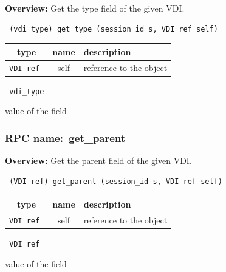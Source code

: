 {\bf Overview:} 
Get the type field of the given VDI.

\begin{verbatim} (vdi_type) get_type (session_id s, VDI ref self)\end{verbatim}



 
\vspace{0.3cm}
\begin{tabular}{|c|c|p{7cm}|}
 \hline
{\bf type} & {\bf name} & {\bf description} \\ \hline
{\tt VDI ref } & self & reference to the object \\ \hline 

\end{tabular}

\vspace{0.3cm}

{\tt 
vdi\_type
}


value of the field
\vspace{0.3cm}
\vspace{0.3cm}
\vspace{0.3cm}
\subsubsection{RPC name:~get\_parent}

{\bf Overview:} 
Get the parent field of the given VDI.

\begin{verbatim} (VDI ref) get_parent (session_id s, VDI ref self)\end{verbatim}



 
\vspace{0.3cm}
\begin{tabular}{|c|c|p{7cm}|}
 \hline
{\bf type} & {\bf name} & {\bf description} \\ \hline
{\tt VDI ref } & self & reference to the object \\ \hline 

\end{tabular}

\vspace{0.3cm}

{\tt 
VDI ref
}


value of the field
\vspace{0.3cm}
\vspace{0.3cm}
\vspace{0.3cm}
